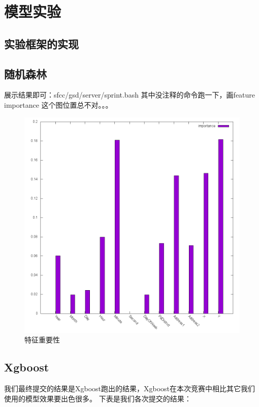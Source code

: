\section{模型实验}
\label{sec:model}

\subsection{实验框架的实现}

\subsection{随机森林}
    展示结果即可：sfcc/gsd/server/sprint.bash
    其中没注释的命令跑一下，画feature importance
	这个图位置总不对。。。
	\begin{figure}[!htb]
	    \centering
	    \includegraphics[width=1.0\linewidth]{fig/importance}
	    \caption{特征重要性}
	    \label{importance}
	\end{figure}

\subsection{Xgboost}
我们最终提交的结果是Xgboost跑出的结果，Xgboost在本次竞赛中相比其它我们使用的模型效果要出色很多。
下表是我们各次提交的结果：

